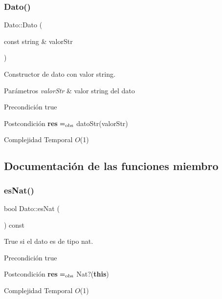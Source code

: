 \subsubsection{\texorpdfstring{Dato()}{Dato()}\hspace{0.1cm}{\footnotesize\ttfamily [2/2]}}
{\footnotesize\ttfamily Dato\+::\+Dato (\begin{DoxyParamCaption}\item[{const string \&}]{valor\+Str }\end{DoxyParamCaption})}



Constructor de dato con valor string. 


\begin{DoxyParams}{Parámetros}
{\em valor\+Str} & valor string del dato\\
\hline
\end{DoxyParams}
\begin{DoxyPrecond}{Precondición}
true 
\end{DoxyPrecond}
\begin{DoxyPostcond}{Postcondición}
{\bfseries res} $=_{\rm obs}$ dato\+Str(valor\+Str) 
\begin{DoxyDescription}
\item[Complejidad Temporal]$O$(1)
\end{DoxyDescription}
\end{DoxyPostcond}


\subsection{Documentación de las funciones miembro}
\mbox{\label{classDato_ac249a298a8ebc465af56bfc816ed03f4}} 
\subsubsection{\texorpdfstring{es\+Nat()}{esNat()}}
{\footnotesize\ttfamily bool Dato\+::es\+Nat (\begin{DoxyParamCaption}{ }\end{DoxyParamCaption}) const}



True si el dato es de tipo nat. 

\begin{DoxyPrecond}{Precondición}
true 
\end{DoxyPrecond}
\begin{DoxyPostcond}{Postcondición}
{\bfseries res} $=_{\rm obs}$ Nat?({\bfseries this}) 
\begin{DoxyDescription}
\item[Complejidad Temporal]$O$(1)
\end{DoxyDescription}
\end{DoxyPostcond}
\mbox{\label{classDato_a068bb78e76cf0a1388d9bdec4e509355}} 
